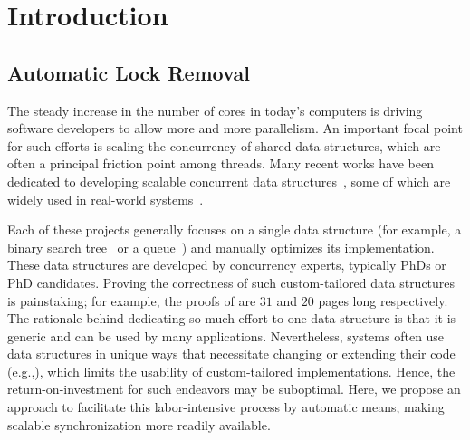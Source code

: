 
\section{Introduction} \label{sec:intro}

\subsection{Automatic Lock Removal}
The steady increase in the number of cores in today's computers is driving software developers to allow more and more parallelism.
An important focal point for such efforts is scaling the concurrency of shared data structures, which are often a principal friction point among threads.
Many recent works have been dedicated to developing scalable concurrent data
structures~\cite{ArbelA2014,DrachslerVY2014,NatarajanM2014,BrownER2014,CrainGR2013,BraginskyP2012,
AfekKKMT2012,EllenFRB2010,BronsonCCO2010,HerlihyLLS2007,Michael:1996},
some of which are widely used in real-world systems~\cite{Ohad:OOPSLA11}.

Each of these projects generally focuses on a single data
structure (for example, a binary search tree~\cite{BronsonCCO2010} or a queue~\cite{Michael:1996}) and manually optimizes its implementation. These data structures are developed by concurrency experts, typically PhDs or PhD candidates.
Proving the correctness of such custom-tailored data structures is painstaking;
for example, the proofs of \cite{BraginskyP2012,EllenFRB2010} are $31$ and $20$ pages long
respectively.
The rationale behind dedicating so much effort to one data structure is that it is
generic and can be used by many applications. Nevertheless,  systems often use data structures in unique ways
that necessitate changing or extending their code (e.g.,\cite{levelDB,zyulkyarov2009atomic,jmonkey,Ohad:OOPSLA11}), which limits the usability of custom-tailored
implementations. Hence, the return-on-investment for such endeavors may be suboptimal.
Here, we propose an approach to facilitate this labor-intensive process by automatic means,
making scalable synchronization more readily available.

